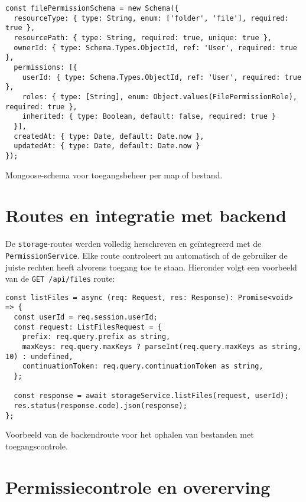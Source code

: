 \begin{listing}[H]
\begin{verbatim}
const filePermissionSchema = new Schema({
  resourceType: { type: String, enum: ['folder', 'file'], required: true },
  resourcePath: { type: String, required: true, unique: true },
  ownerId: { type: Schema.Types.ObjectId, ref: 'User', required: true },
  permissions: [{
    userId: { type: Schema.Types.ObjectId, ref: 'User', required: true },
    roles: { type: [String], enum: Object.values(FilePermissionRole), required: true },
    inherited: { type: Boolean, default: false, required: true }
  }],
  createdAt: { type: Date, default: Date.now },
  updatedAt: { type: Date, default: Date.now }
});
\end{verbatim}
\caption[Schema voor FilePermission documenten]{Mongoose-schema voor toegangsbeheer per map of bestand.}
\end{listing}

\section{Routes en integratie met backend}

De \texttt{storage}-routes werden volledig herschreven en geïntegreerd met de \texttt{PermissionService}. Elke route controleert nu automatisch of de gebruiker de juiste rechten heeft alvorens toegang toe te staan. Hieronder volgt een voorbeeld van de \texttt{GET /api/files} route:

\begin{listing}[H]
\begin{verbatim}
const listFiles = async (req: Request, res: Response): Promise<void> => {
  const userId = req.session.userId;
  const request: ListFilesRequest = {
    prefix: req.query.prefix as string,
    maxKeys: req.query.maxKeys ? parseInt(req.query.maxKeys as string, 10) : undefined,
    continuationToken: req.query.continuationToken as string,
  };

  const response = await storageService.listFiles(request, userId);
  res.status(response.code).json(response);
};
\end{verbatim}
\caption[Route voor bestandsoverzicht]{Voorbeeld van de backendroute voor het ophalen van bestanden met toegangscontrole.}
\end{listing}

\section{Permissiecontrole en overerving}

